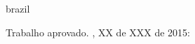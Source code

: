 \documentclass[
  10pt,				%
  oneside,
  a4paper,			%
  brazilian,
  english
]{abntex2}
\begin{document}
%
% 
%
\begin{folhadeaprovacao}
  \begin{otherlanguage*}{brazil}

    \begin{center}
      {\ABNTEXchapterfont\large\imprimirautor}

      \vspace*{\fill}\vspace*{\fill}
      \begin{center}
        \ABNTEXchapterfont\bfseries\Large\imprimirtitulo
      \end{center}
      \vspace*{\fill}

      \hspace{.45\textwidth}
      \begin{minipage}{.5\textwidth}
          \imprimirpreambulo
      \end{minipage}%
      \vspace*{\fill}
     \end{center}

     Trabalho aprovado. \imprimirlocal, XX de XXX de 2015:


     \begin{center}
      \vspace*{0.5cm}
      {\large\imprimirlocal}
      \par
      {\large\imprimirdata}
      \vspace*{1cm}
    \end{center}
  \end{otherlanguage*}
\end{folhadeaprovacao}

\end{document}
